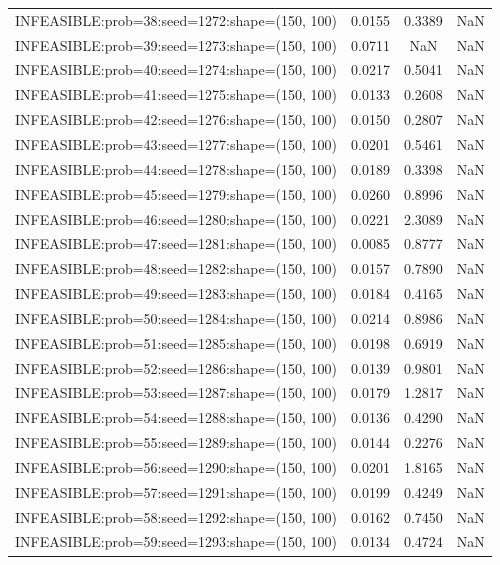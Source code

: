 \begin{longtable}{lccc}
INFEASIBLE:prob=38:seed=1272:shape=(150, 100)  &   0.0155 &  0.3389 &    NaN \\
INFEASIBLE:prob=39:seed=1273:shape=(150, 100)  &   0.0711 &     NaN &    NaN \\
INFEASIBLE:prob=40:seed=1274:shape=(150, 100)  &   0.0217 &  0.5041 &    NaN \\
INFEASIBLE:prob=41:seed=1275:shape=(150, 100)  &   0.0133 &  0.2608 &    NaN \\
INFEASIBLE:prob=42:seed=1276:shape=(150, 100)  &   0.0150 &  0.2807 &    NaN \\
INFEASIBLE:prob=43:seed=1277:shape=(150, 100)  &   0.0201 &  0.5461 &    NaN \\
INFEASIBLE:prob=44:seed=1278:shape=(150, 100)  &   0.0189 &  0.3398 &    NaN \\
INFEASIBLE:prob=45:seed=1279:shape=(150, 100)  &   0.0260 &  0.8996 &    NaN \\
INFEASIBLE:prob=46:seed=1280:shape=(150, 100)  &   0.0221 &  2.3089 &    NaN \\
INFEASIBLE:prob=47:seed=1281:shape=(150, 100)  &   0.0085 &  0.8777 &    NaN \\
INFEASIBLE:prob=48:seed=1282:shape=(150, 100)  &   0.0157 &  0.7890 &    NaN \\
INFEASIBLE:prob=49:seed=1283:shape=(150, 100)  &   0.0184 &  0.4165 &    NaN \\
INFEASIBLE:prob=50:seed=1284:shape=(150, 100)  &   0.0214 &  0.8986 &    NaN \\
INFEASIBLE:prob=51:seed=1285:shape=(150, 100)  &   0.0198 &  0.6919 &    NaN \\
INFEASIBLE:prob=52:seed=1286:shape=(150, 100)  &   0.0139 &  0.9801 &    NaN \\
INFEASIBLE:prob=53:seed=1287:shape=(150, 100)  &   0.0179 &  1.2817 &    NaN \\
INFEASIBLE:prob=54:seed=1288:shape=(150, 100)  &   0.0136 &  0.4290 &    NaN \\
INFEASIBLE:prob=55:seed=1289:shape=(150, 100)  &   0.0144 &  0.2276 &    NaN \\
INFEASIBLE:prob=56:seed=1290:shape=(150, 100)  &   0.0201 &  1.8165 &    NaN \\
INFEASIBLE:prob=57:seed=1291:shape=(150, 100)  &   0.0199 &  0.4249 &    NaN \\
INFEASIBLE:prob=58:seed=1292:shape=(150, 100)  &   0.0162 &  0.7450 &    NaN \\
INFEASIBLE:prob=59:seed=1293:shape=(150, 100)  &   0.0134 &  0.4724 &    NaN \\

\end{longtable}
